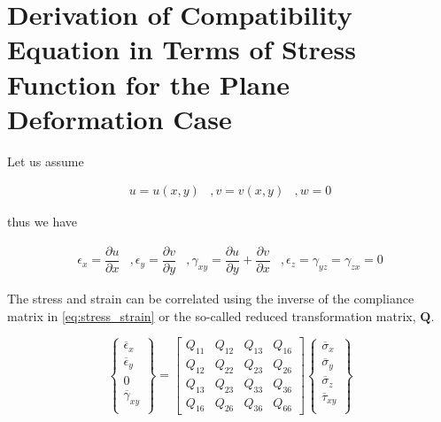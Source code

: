 \section{Derivation of Compatibility Equation in Terms of Stress Function for the Plane Deformation Case} \label{app:plane_strain}

Let us assume

\begin{equation*}
    \begin{matrix}
    u = u(x, y) & , 
    v = v (x, y) & , 
    w = 0
    \end{matrix}
\end{equation*}

thus we have

\begin{equation*}
    \begin{matrix}
    \epsilon_x = \dfrac{\partial u}{\partial x} & , 
    \epsilon_y = \dfrac{\partial v}{\partial y} & , 
    \gamma_{xy} = \dfrac{\partial u}{\partial y} + \dfrac{\partial v}{\partial x} & , 
    \epsilon_z = \gamma_{yz} = \gamma_{zx} = 0
    \end{matrix}
\end{equation*}

The stress and strain can be correlated using the inverse of the compliance matrix in \cref{eq:stress_strain} or the so-called reduced transformation matrix, $\bm{Q}$.

\begin{equation}
\begin{Bmatrix}
\overline{\epsilon}_x\\ 
\overline{\epsilon}_y\\ 
0\\ 
\overline{\gamma}_{xy}\\
\end{Bmatrix}
=\begin{bmatrix}
Q_{11} & Q_{12} & Q_{13} & Q_{16} \\ 
Q_{12} & Q_{22} & Q_{23} & Q_{26} \\ 
Q_{13} & Q_{23} & Q_{33} & Q_{36} \\ 
Q_{16} & Q_{26} & Q_{36} & Q_{66} 
\end{bmatrix}
\begin{Bmatrix}
\overline{\sigma}_x\\ 
\overline{\sigma}_y\\ 
\overline{\sigma}_z\\ 
\overline{\tau}_{xy}\\
\end{Bmatrix}
\label{eq:stress_strain_reduced}
\end{equation}


